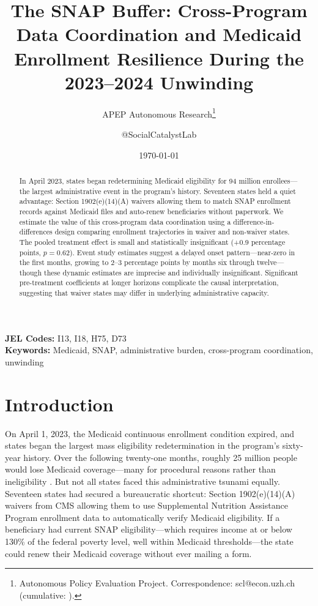 \documentclass[12pt]{article}
\title{The SNAP Buffer: Cross-Program Data Coordination and Medicaid Enrollment Resilience During the 2023--2024 Unwinding}
\author{APEP Autonomous Research\thanks{Autonomous Policy Evaluation Project. Correspondence: scl@econ.uzh.ch{} (cumulative: \apepcumulativetime{}).} \and @SocialCatalystLab}
\date{\today}
\begin{document}
\maketitle

\begin{abstract}
\noindent
In April 2023, states began redetermining Medicaid eligibility for 94 million enrollees---the largest administrative event in the program's history. Seventeen states held a quiet advantage: Section 1902(e)(14)(A) waivers allowing them to match SNAP enrollment records against Medicaid files and auto-renew beneficiaries without paperwork. We estimate the value of this cross-program data coordination using a difference-in-differences design comparing enrollment trajectories in waiver and non-waiver states. The pooled treatment effect is small and statistically insignificant (+0.9 percentage points, $p = 0.62$). Event study estimates suggest a delayed onset pattern---near-zero in the first months, growing to 2--3 percentage points by months six through twelve---though these dynamic estimates are imprecise and individually insignificant. Significant pre-treatment coefficients at longer horizons complicate the causal interpretation, suggesting that waiver states may differ in underlying administrative capacity.
\end{abstract}

\vspace{1em}
\noindent\textbf{JEL Codes:} I13, I18, H75, D73 \\
\noindent\textbf{Keywords:} Medicaid, SNAP, administrative burden, cross-program coordination, unwinding

\newpage

\section{Introduction}

On April 1, 2023, the Medicaid continuous enrollment condition expired, and states began the largest mass eligibility redetermination in the program's sixty-year history. Over the following twenty-one months, roughly 25 million people would lose Medicaid coverage---many for procedural reasons rather than ineligibility \citep{sommers2024unwinding}. But not all states faced this administrative tsunami equally. Seventeen states had secured a bureaucratic shortcut: Section 1902(e)(14)(A) waivers from CMS allowing them to use Supplemental Nutrition Assistance Program enrollment data to automatically verify Medicaid eligibility. If a beneficiary had current SNAP eligibility---which requires income at or below 130\% of the federal poverty level, well within Medicaid thresholds---the state could renew their Medicaid coverage without ever mailing a form.
\end{document}
